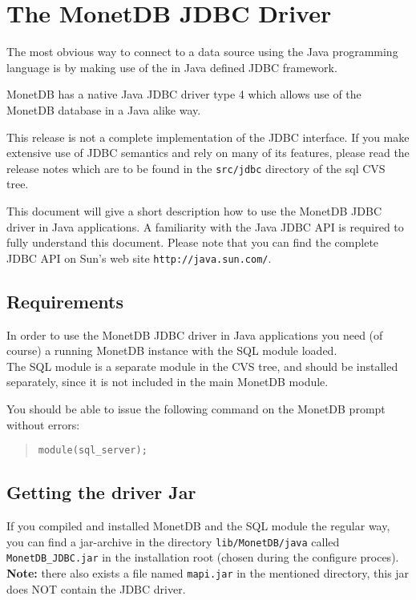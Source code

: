 \documentclass{article}
\begin{document}
\section{The MonetDB JDBC Driver}
The most obvious way to connect to a data source using the Java programming language
is by making use of the in Java defined JDBC framework.

MonetDB has a native Java JDBC driver type 4 which allows use of the MonetDB database in
a Java alike way.

This release is not a complete implementation of the JDBC interface. If you make
extensive use of JDBC semantics and rely on many of its features, please
read the release notes which are to be found in the \texttt{src/jdbc} directory of the sql
CVS tree.

This document will give a short description how to use the MonetDB JDBC driver in
Java applications.  A familiarity with the Java JDBC API is required to fully understand
this document.  Please note that you can find the complete JDBC API on Sun's web site
\texttt{http://java.sun.com/}.

\subsection{Requirements}
In order to use the MonetDB JDBC driver in Java applications you need (of course) a running MonetDB instance with the SQL module loaded.\\
The SQL module is a separate module in the CVS tree, and should be installed separately, since
it is not included in the main MonetDB module.

You should be able to issue the following command on the MonetDB prompt without errors:
\begin{quote}
\texttt{module(sql\_server);}
\end{quote}

\subsection{Getting the driver Jar}
If you compiled and installed MonetDB and the SQL module the regular way, you can find a
jar-archive in the directory \texttt{lib/MonetDB/java} called \texttt{MonetDB_JDBC.jar} in the
installation root (chosen during the configure proces).\\
\textbf{Note:} there also exists a file named \texttt{mapi.jar} in the mentioned directory, this
jar does NOT contain the JDBC driver.
\end{document}
